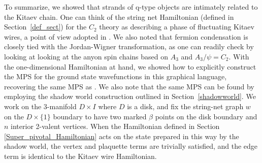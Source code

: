 To summarize, we showed that strands of q-type objects are intimately related to the Kitaev chain. 
One can think of the string net Hamiltonian (defined in Section~\ref{def_sect}) for the $C_2$ theory as describing a phase of fluctuating Kitaev wires, a point of view adopted in \cite{tarantino2016,ware2016,kapustin2017}.
We also noted that fermion condensation is closely tied with the Jordan-Wigner transformation, as one can readily check by looking at looking at the anyon spin chains based on $A_3$ and $A_3/\psi = C_2$.
With the one-dimensional Hamiltonian at hand, we showed how to explicitly construct the MPS for the ground state wavefunctions in this graphical language, recovering the same MPS as \cite{fidkowski2011,turzillo2016,bultinck2017b}.
We also note that the same MPS can be found by employing the shadow world construction outlined in Section~\ref{shadowworld}. We work on the 3-manifold $D\times I$ where $D$ is a disk,  
and fix the string-net graph $w$ on the $D \times \{1\}$ boundary to have two marked $\beta$ points on the disk boundary and $n$ interior 2-valent vertices. 
When the Hamiltonian defined in Section \ref{Super_pivotal_Hamiltonian} acts on the state prepared in this way by the shadow world, the vertex and plaquette terms are trivially satisfied, 
and the edge term is identical to the Kitaev wire Hamiltonian. 
